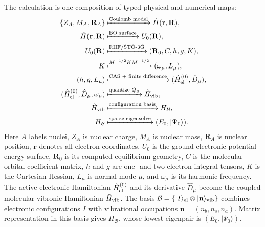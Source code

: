 \documentclass[10pt,twocolumn]{article}
\newcommand{\ket}[1]{\lvert #1\rangle}
\begin{document}
The calculation is one composition of typed physical and numerical maps:
{\scriptsize
\begin{equation}
\begin{aligned}
\{Z_A,M_A,\mathbf R_A\}
&\xmapsto{\text{Coulomb model}}\hat H(\mathbf r,\mathbf R),\\
\hat H(\mathbf r,\mathbf R)
&\xmapsto{\text{BO surface}}U_0(\mathbf R),\\
U_0(\mathbf R)
&\xmapsto{\text{RHF/STO-3G}}(\mathbf R_0,C,h,g,K),\\
K&\xmapsto{M^{-1/2}KM^{-1/2}}(\omega_\mu,L_\mu),\\
(h,g,L_\mu)&\xmapsto{\text{CAS + finite difference}}
(\hat H_{\rm el}^{(0)},\hat D_\mu),\\
(\hat H_{\rm el}^{(0)},\hat D_\mu,\omega_\mu)
&\xmapsto{\text{quantize }Q_\mu}\hat H_{\rm vib},\\
\hat H_{\rm vib}
&\xmapsto{\text{configuration basis}}H_{\mathcal B},\\
H_{\mathcal B}
&\xmapsto{\text{sparse eigensolve}}(E_0,\ket{\Psi_0}).
\end{aligned}
\label{eq:architecture}
\end{equation}}
Here $A$ labels nuclei, $Z_A$ is nuclear charge, $M_A$ is nuclear mass,
$\mathbf R_A$ is nuclear position, $\mathbf r$ denotes all electron
coordinates, $U_0$ is the ground electronic potential-energy surface,
$\mathbf R_0$ is its computed equilibrium geometry, $C$ is the molecular-
orbital coefficient matrix, $h$ and $g$ are one- and two-electron integral
tensors, $K$ is the Cartesian Hessian, $L_\mu$ is normal mode $\mu$, and
$\omega_\mu$ is its harmonic frequency.  The active electronic Hamiltonian
$\hat H_{\rm el}^{(0)}$ and its derivative $\hat D_\mu$ become the coupled
molecular-vibronic Hamiltonian $\hat H_{\rm vib}$.  The basis
$\mathcal B=\{\ket I_{\rm el}\otimes\ket{\mathbf n}_{\rm vib}\}$ combines
electronic configurations $I$ with vibrational occupations
$\mathbf n=(n_b,n_s,n_a)$.  Matrix representation in this basis gives
$H_{\mathcal B}$, whose lowest eigenpair is $(E_0,\ket{\Psi_0})$.
\end{document}
